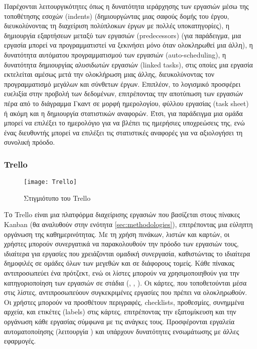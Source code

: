                 Παρέχονται λειτουργικότητες όπως η δυνατότητα ιεράρχησης των εργασιών μέσω της τοποθέτησης εσοχών (indents) (δημιουργώντας μιας σαφούς δομής του έργου, διευκολύνοντας τη διαχείριση πολύπλοκων έργων με πολλές υποκατηγορίες), η δημιουργία εξαρτήσεων μεταξύ των εργασιών (predecessors) (για παράδειγμα, μια εργασία μπορεί να προγραμματιστεί να ξεκινήσει μόνο όταν ολοκληρωθεί μια άλλη), η δυνατότητα αυτόματου προγραμματισμού των εργασιών (auto-scheduling), η δυνατότητα δημιουργίας αλυσιδωτών εργασιών (linked tasks), στις οποίες μια εργασία εκτελείται αμέσως μετά την ολοκλήρωση μιας άλλης, διευκολύνοντας τον προγραμματισμό μεγάλων και σύνθετων έργων. Επιπλέον, το λογισμικό προσφέρει ευελιξία στην προβολή των δεδομένων, επιτρέποντας την αποτύπωση των εργασιών πέρα από το διάγραμμα Γκαντ σε μορφή ημερολογίου, φύλλου εργασίας (task sheet) ή ακόμη και η δημιουργία στατιστικών αναφορών. Έτσι, για παράδειγμα μια ομάδα μπορεί να επιλέξει το ημερολόγιο για να βλέπει τις ημερήσιες υποχρεώσεις της, ενώ ένας διευθυντής μπορεί να επιλέξει τις στατιστικές αναφορές για να αξιολογήσει τη συνολική πρόοδο.

            \subsubsection{Trello}
                \begin{figure}[h!] \noindent \centering
                    \texttt{[image: Trello]}
                    \caption{Στιγμιότυπο του Trello}
                \end{figure}

                Το Trello \cite{Trello} είναι μια πλατφόρμα διαχείρισης εργασιών που βασίζεται στους πίνακες Kanban (θα αναλυθούν στην ενότητα \ref{sec:methodologies}), επιτρέποντας μια εύληπτη οργάνωση της καθημερινότητας. Με τη χρήση πινάκων, λιστών και καρτών, οι χρήστες μπορούν συνεργατικά να παρακολουθούν την πρόοδο των εργασιών τους, ιδιαίτερα για εργασίες που χρειάζονται ομαδική συνεργασία, καθιστώντας το ιδιαίτερα δημοφιλές σε ομάδες όλων των μεγεθών και σε διάφορους τομείς. Κάθε πίνακας αντιπροσωπεύει ένα πρότζεκτ, ενώ οι λίστες μπορούν να χρησιμοποιηθούν για την κατηγοριοποίηση των εργασιών σε στάδια (, , ). Οι κάρτες, που τοποθετούνται μέσα στις λίστες, αντιπροσωπεύουν συγκεκριμένες εργασίες που πρέπει να ολοκληρωθούν. Οι χρήστες μπορούν να προσθέτουν περιγραφές, checklists, προθεσμίες, συνημμένα αρχεία, και ετικέτες (labels) στις κάρτες, επιτρέποντας την εξατομίκευση και την οργάνωση κάθε εργασίας σύμφωνα με τις ανάγκες τους. Προσφέρονται εργαλεία αυτοματοποίησης (λειτουργία ) και υπάρχουν δυνατότητες ενσωμάτωσης με άλλες εφαρμογές.


